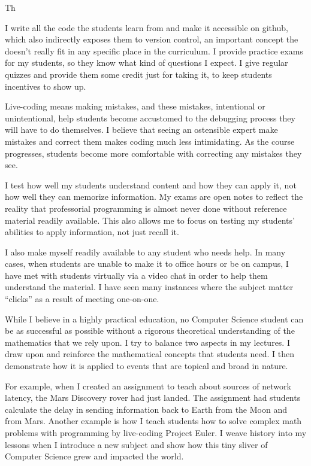\documentclass[a4paper]{article}
\begin{document}
Th


I write all the code the students learn from and make it accessible on github, which also indirectly exposes them to version control, an important concept the doesn't really fit in any specific place in the curriculum. 
I provide practice exams for my students, so they know what kind of questions I expect.
I give regular quizzes and provide them some credit just for taking it, to keep students incentives to show up.

Live-coding means making mistakes, and these mistakes, intentional or unintentional, help students become accustomed to the debugging process they will have to do themselves.
I believe that seeing an ostensible expert make mistakes and correct them makes coding much less intimidating.
As the course progresses, students become more comfortable with correcting any mistakes they see.



I test how well my students understand content and how they can apply it, not how well they can memorize information.
My exams are open notes to reflect the reality that professorial programming is almost never done without reference material readily available.
This also allows me to focus on testing my students' abilities to apply information, not just recall it.

I also make myself readily available to any student who needs help.
In many cases, when students are unable to make it to office hours or be on campus, I have met with students virtually via a video chat in order to help them understand the material.
I have seen many instances where the subject matter ``clicks'' as a result of meeting one-on-one.

While I believe in a highly practical education, no Computer Science student can be as successful as possible without a rigorous theoretical understanding of the mathematics that we rely upon.
I try to balance two aspects in my lectures.
I draw upon and reinforce the mathematical concepts that students need. 
I then demonstrate how it is applied to events that are topical and broad in nature.

For example, when I created an assignment to teach about sources of network latency, the Mars Discovery rover had just landed.
The assignment had students calculate the delay in sending information back to Earth from the Moon and from Mars.
Another example is how I teach students how to solve complex math problems with programming by live-coding Project Euler.
I weave history into my lessons when I introduce a new subject and show how this tiny sliver of Computer Science grew and impacted the world.
\end{document}
